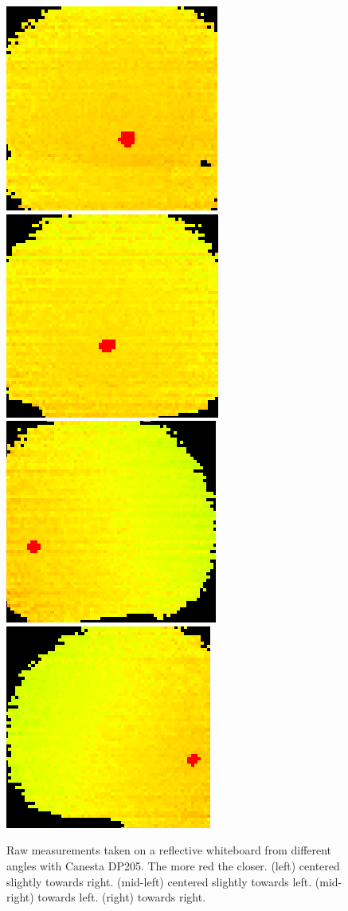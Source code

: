 \documentclass[a4paper, 11pt]{article}
\begin{document}
\begin{multicols}{4}
        \begin{figure}[ht!]
            \includegraphics[width=.25\textwidth]{img/camera/1.png}\hfill
            \includegraphics[width=.25\textwidth]{img/camera/2.png}\hfill
            \includegraphics[width=.25\textwidth]{img/camera/3.png}\hfill
            \includegraphics[width=.25\textwidth]{img/camera/4.png}\hfill   
            \caption{Raw measurements taken on a reflective whiteboard from different angles with Canesta DP205. The more red the closer. (left) centered slightly towards right. (mid-left) centered slightly towards left. (mid-right) towards left. (right) towards right. }
        \end{figure}
\end{multicols}


\end{document}
